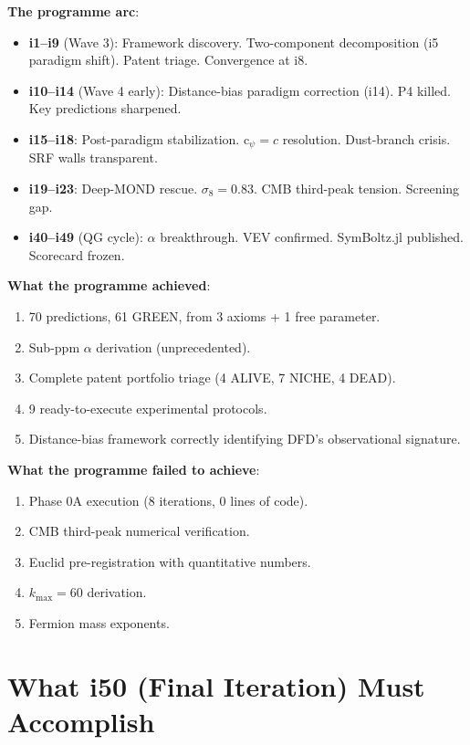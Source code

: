 \documentclass[11pt,a4paper]{article}
\begin{document}
\begin{tcolorbox}[colback=blue!5!white, colframe=blue!60!black,
  title={Programme Trajectory: Where We Stand at i49}]

\textbf{The programme arc}:
\begin{itemize}
\item \textbf{i1--i9} (Wave 3): Framework discovery. Two-component decomposition (i5 paradigm shift). Patent triage. Convergence at i8.
\item \textbf{i10--i14} (Wave 4 early): Distance-bias paradigm correction (i14). P4 killed. Key predictions sharpened.
\item \textbf{i15--i18}: Post-paradigm stabilization. c$_\psi = c$ resolution. Dust-branch crisis. SRF walls transparent.
\item \textbf{i19--i23}: Deep-MOND rescue. $\sigma_8 = 0.83$. CMB third-peak tension. Screening gap.
\item \textbf{i40--i49} (QG cycle): $\alpha$ breakthrough. VEV confirmed. SymBoltz.jl published. Scorecard frozen.
\end{itemize}

\textbf{What the programme achieved}:
\begin{enumerate}
\item 70 predictions, 61 GREEN, from 3 axioms + 1 free parameter.
\item Sub-ppm $\alpha$ derivation (unprecedented).
\item Complete patent portfolio triage (4 ALIVE, 7 NICHE, 4 DEAD).
\item 9 ready-to-execute experimental protocols.
\item Distance-bias framework correctly identifying DFD's observational signature.
\end{enumerate}

\textbf{What the programme failed to achieve}:
\begin{enumerate}
\item Phase 0A execution (8 iterations, 0 lines of code).
\item CMB third-peak numerical verification.
\item Euclid pre-registration with quantitative numbers.
\item $k_{\max} = 60$ derivation.
\item Fermion mass exponents.
\end{enumerate}
\end{tcolorbox}

\section{What i50 (Final Iteration) Must Accomplish}
\end{document}
